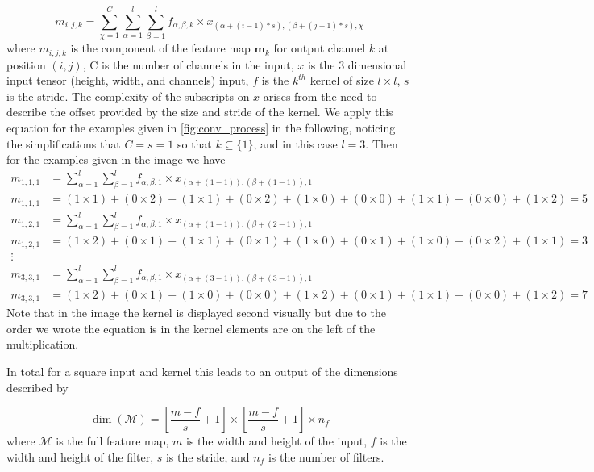 \documentclass[12pt]{article}
\numberwithin{equation}{section}
\numberwithin{figure}{section}
\begin{document}
\begin{equation}
	m_{i,j,k} = \sum_{\chi = 1}^{C}\sum_{\alpha = 1}^{l}\sum_{\beta = 1}^{l} f_{\alpha,\beta, k} \times x_{(\alpha +(i-1)*s), (\beta + (j-1)*s),\chi}
\end{equation}
where $m_{i,j,k}$ is the component of the feature map $\bm{m}_k$ for output channel $k$ at position $(i, j)$, C is the number of channels in the input, $x$ is the 3 dimensional input tensor (height, width, and channels) input, $f$ is the $k^{th}$ kernel of size $l\times l$, $s$ is the stride. The complexity of the subscripts on $x$ arises from the need to describe the offset provided by the size and stride of the kernel. We apply this equation for the examples given in \cref{fig:conv_process} in the following, noticing the simplifications that $C = s = 1$ so that $k \subseteq \{1\}$, and in this case $l = 3$. Then for the examples given in the image we have
\begin{align}
	m_{1, 1, 1} &= \sum_{\alpha = 1}^{l}\sum_{\beta = 1}^{l} f_{\alpha,\beta, 1} \times x_{(\alpha +(1-1)), (\beta + (1-1)),1}	\\
	m_{1, 1, 1} &= (1\times1 )+ (0 \times 2) + (1 \times 1) + (0 \times 2) + (1 \times 0) + (0 \times 0) + (1 \times 1) + (0 \times 0) + (1 \times 2) = 5 \\
	m_{1, 2, 1} &= \sum_{\alpha = 1}^{l}\sum_{\beta = 1}^{l} f_{\alpha,\beta, 1} \times x_{(\alpha +(1-1)), (\beta + (2-1)),1}	\\
	m_{1, 2, 1} &= (1\times 2)+ (0 \times 1) + (1 \times 1) + (0 \times 1) + (1 \times 0) + (0 \times 1) + (1 \times 0) + (0 \times 2) + (1 \times 1) = 3 \\
	\vdots \nonumber	\\
	m_{3, 3, 1} &= \sum_{\alpha = 1}^{l}\sum_{\beta = 1}^{l} f_{\alpha,\beta, 1} \times x_{(\alpha +(3-1)), (\beta + (3-1)),1}	\\
	m_{3, 3, 1} &= (1\times 2)+ (0 \times 1) + (1 \times 0) + (0 \times 0) + (1 \times 2) + (0 \times 1) + (1 \times 1) + (0 \times 0) + (1 \times 2) = 7
\end{align}
Note that in the image the kernel is displayed second visually but due to the order we wrote the equation is in the kernel elements are on the left of the multiplication.



In total for a square input and kernel this leads to an output of the dimensions described by

\begin{equation}
	\label{eq:feat_map1}
	\dim(\mathscr{M}) = \left[\frac{m-f}{s} +1 \right] \times \left[\frac{m-f}{s} +1 \right] \times n_{f}
\end{equation}
where $\mathscr{M}$ is the full feature map, $m$ is the width and height of the input, $f$ is the width and height of the filter, $s$ is the stride, and $n_f$ is the number of filters.
\end{document}
